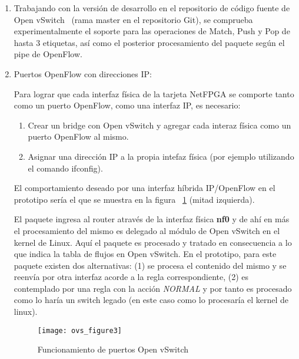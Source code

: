 \begin{enumerate}
\item Trabajando con la versi\'on de desarrollo en el repositorio de c\'odigo fuente de Open vSwitch~\citep{OVSSourceCode} (rama master en el repositorio Git), se comprueba experimentalmente el soporte para las operaciones de Match, Push y Pop de hasta 3 etiquetas, as\'i como el posterior procesamiento del paquete seg\'un el pipe de  OpenFlow.

\item Puertos OpenFlow con direcciones IP:
 
Para lograr que cada interfaz f\'isica de la tarjeta NetFPGA se comporte tanto como un puerto OpenFlow, como una interfaz IP, es necesario:

\begin{enumerate}
\item Crear un bridge con Open vSwitch y agregar cada interaz f\'isica como un puerto OpenFlow al mismo.
\item Asignar una dirección IP a la propia intefaz f\'isica (por ejemplo utilizando el comando ifconfig).
\end{enumerate}


El comportamiento deseado por una interfaz h\'ibrida IP/OpenFlow en el prototipo ser\'ia el que se muestra en la figura ~\ref{fig:OVSInterfaces} (mitad izquierda).

El paquete ingresa al router atrav\'es de la interfaz f\'isica \textbf{nf0} y de ah\'i en m\'as el procesamiento del mismo es delegado al m\'odulo de Open vSwitch en el kernel de Linux. Aqu\'i el paquete es procesado y tratado en consecuencia a lo que indica la tabla de flujos en Open vSwitch. En el prototipo, para este paquete existen dos alternativas: (1) se procesa el contenido del mismo y se reenv\'ia por otra interfaz acorde a la regla correspondiente, (2) es contemplado por una regla con la acci\'on \textit{NORMAL} y por tanto es procesado como lo har\'ia un switch legado (en este caso como lo procesar\'ia el kernel de linux).\\

\begin{figure}[h!] 
\centering    
\texttt{[image: ovs\_figure3]}
\caption[Funcionamiento de puertos Open vSwitch]{Funcionamiento de puertos Open vSwitch}
\label{fig:OVSInterfaces}
\end{figure}


\end{enumerate}
